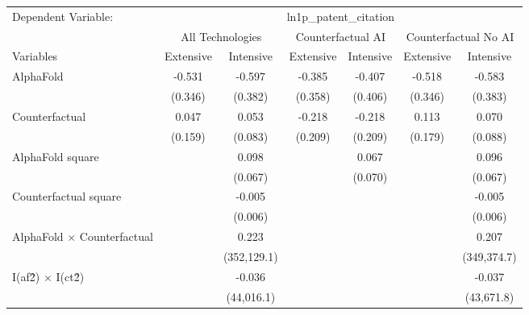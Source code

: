 \begingroup
\centering
\begin{tabular}{lcccccc}
   \tabularnewline \midrule \midrule
   Dependent Variable: & \multicolumn{6}{c}{ln1p\_patent\_citation}\\
 & \multicolumn{2}{c}{All Technologies} & \multicolumn{2}{c}{Counterfactual AI} & \multicolumn{2}{c}{Counterfactual No AI} \\
\cmidrule(lr){1-1}\cmidrule(lr){2-3} \cmidrule(lr){4-5} \cmidrule(lr){6-7}
Variables & \multicolumn{1}{c}{Extensive} & \multicolumn{1}{c}{Intensive} & \multicolumn{1}{c}{Extensive} & \multicolumn{1}{c}{Intensive} & \multicolumn{1}{c}{Extensive} & \multicolumn{1}{c}{Intensive} \\
\cmidrule(lr){1-1}\cmidrule(lr){2-2} \cmidrule(lr){3-3} \cmidrule(lr){4-4} \cmidrule(lr){5-5} \cmidrule(lr){6-6} \cmidrule(lr){7-7}
   AlphaFold                          & -0.531  & -0.597      & -0.385  & -0.407  & -0.518  & -0.583\\   
                                      & (0.346) & (0.382)     & (0.358) & (0.406) & (0.346) & (0.383)\\   
   Counterfactual                     & 0.047   & 0.053       & -0.218  & -0.218  & 0.113   & 0.070\\   
                                      & (0.159) & (0.083)     & (0.209) & (0.209) & (0.179) & (0.088)\\   
   AlphaFold square                   &         & 0.098       &         & 0.067   &         & 0.096\\   
                                      &         & (0.067)     &         & (0.070) &         & (0.067)\\   
   Counterfactual square              &         & -0.005      &         &         &         & -0.005\\   
                                      &         & (0.006)     &         &         &         & (0.006)\\   
   AlphaFold $\times$ Counterfactual  &         & 0.223       &         &         &         & 0.207\\   
                                      &         & (352,129.1) &         &         &         & (349,374.7)\\   
   I(af\^2) $\times$ I(ct\^2)         &         & -0.036      &         &         &         & -0.037\\   
                                      &         & (44,016.1)  &         &         &         & (43,671.8)\\   

\end{tabular}
